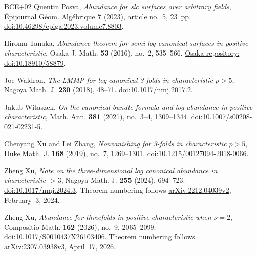 \begin{thebibliography}{BCE+02}
Quentin Posva, \emph{Abundance for slc surfaces over arbitrary fields},
\'Epijournal G\'eom. Alg\'ebrique \textbf{7} (2023), article no.~5, 23~pp.
\href{https://doi.org/10.46298/epiga.2023.volume7.8803}{doi:10.46298/epiga.2023.volume7.8803}.

Hiromu Tanaka,
\emph{Abundance theorem for semi log canonical surfaces in positive characteristic},
Osaka J. Math. \textbf{53} (2016), no.~2, 535--566.
\href{https://doi.org/10.18910/58879}{Osaka repository: doi:10.18910/58879}.

Joe Waldron, \emph{The LMMP for log canonical 3-folds in characteristic $p>5$},
Nagoya Math. J. \textbf{230} (2018), 48--71.
\href{https://doi.org/10.1017/nmj.2017.2}{doi:10.1017/nmj.2017.2}.

Jakub Witaszek,
\emph{On the canonical bundle formula and log abundance in positive characteristic},
Math. Ann. \textbf{381} (2021), no.~3--4, 1309--1344.
\href{https://doi.org/10.1007/s00208-021-02231-5}{doi:10.1007/s00208-021-02231-5}.

Chenyang Xu and Lei Zhang,
\emph{Nonvanishing for 3-folds in characteristic $p>5$},
Duke Math. J. \textbf{168} (2019), no.~7, 1269--1301.
\href{https://doi.org/10.1215/00127094-2018-0066}{doi:10.1215/00127094-2018-0066}.

Zheng Xu,
\emph{Note on the three-dimensional log canonical abundance in characteristic $>3$},
Nagoya Math. J. \textbf{255} (2024), 694--723.
\href{https://doi.org/10.1017/nmj.2024.3}{doi:10.1017/nmj.2024.3}.
Theorem numbering follows
\href{https://arxiv.org/abs/2212.04039v2}{arXiv:2212.04039v2}, February~3, 2024.

Zheng Xu, \emph{Abundance for threefolds in positive characteristic when $\nu=2$},
Compositio Math. \textbf{162} (2026), no.~9, 2065--2099.
\href{https://doi.org/10.1017/S0010437X26103406}{doi:10.1017/S0010437X26103406}.
Theorem numbering follows
\href{https://arxiv.org/abs/2307.03938v3}{arXiv:2307.03938v3}, April~17, 2026.

\end{thebibliography}
